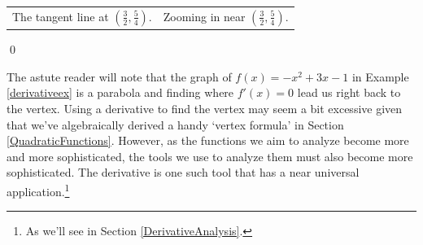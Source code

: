 \documentclass{ximera}
\begin{document}
\begin{ex}
\begin{enumerate}
\begin{center}
\begin{tabular}{cc}
 The tangent line at  $\left(\frac{3}{2}, \frac{5}{4} \right)$. & Zooming in near $\left(\frac{3}{2}, \frac{5}{4} \right)$.  \\
 
 \end{tabular}
 
 \end{center}
 
 \hfill \qed


\end{enumerate}

\end{ex}

The astute reader will note that the graph of $f(x) = -x^2+3x-1$ in Example \ref{derivativeex} is a parabola and finding where $f'(x) = 0$ lead us right back to the vertex.  Using a derivative to find the vertex may seem a bit excessive given that we've algebraically derived a handy `vertex formula' in Section \ref{QuadraticFunctions}.   However, as the functions we aim to analyze become more and more sophisticated, the tools we use to analyze them must also become more sophisticated.  The derivative is one such tool that has a near universal application.\footnote{As we'll see in Section \ref{DerivativeAnalysis}.}

\medskip
\end{document}
